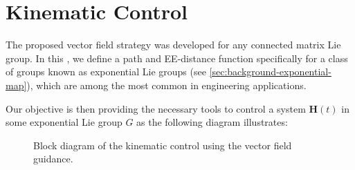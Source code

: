\chapter{Kinematic Control}\label{ch:kinematic}
The proposed vector field strategy was developed for any connected matrix Lie group. In this , we define a path and EE-distance function specifically for a class of groups known as exponential Lie groups (see \cref{sec:background-exponential-map}), which are among the most common in engineering applications.

Our objective is then providing the necessary tools to control a system $\mathbf{H}(t)$ in some exponential Lie group $G$ as the following diagram illustrates:
\begin{figure}[ht]
    \centering
    \caption{Block diagram of the kinematic control using the vector field guidance.}
    \label{fig:kinematic-control-diagram}
\end{figure}

